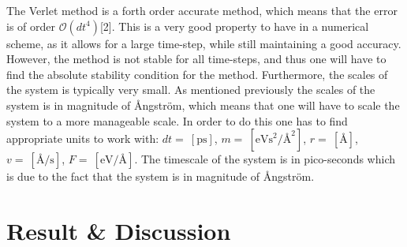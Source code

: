 \documentclass[a4paper]{article}
\newcommand{\newparagraph}{\vspace{.5cm}\noindent}
\begin{document}
\newparagraph
The Verlet method is a forth order accurate method, which means that the error is of order $\mathcal{O}(dt^4)$[2]. This is a very good property to have in a numerical scheme, as it allows for a large time-step, while still maintaining a good accuracy.
However, the method is not stable for all time-steps, and thus one will have to find the absolute stability condition for the method. 
Furthermore, the scales of the system is typically very small. As mentioned previously the scales of the system is in magnitude of Ångström, which means that one will have to scale the system to a more manageable scale.
In order to do this one has to find appropriate units to work with: $dt = ~[\text{ps}]$, $m = ~[\text{eVs}^2/\text{Å}^2]$, $r = ~[\text{Å}]$, $v = ~[\text{Å/s}]$, $F = ~[\text{eV/Å}]$.
The timescale of the system is in pico-seconds which is due to the fact that the system is in magnitude of Ångström.

\newpage
\section{Result \& Discussion}
\end{document}
